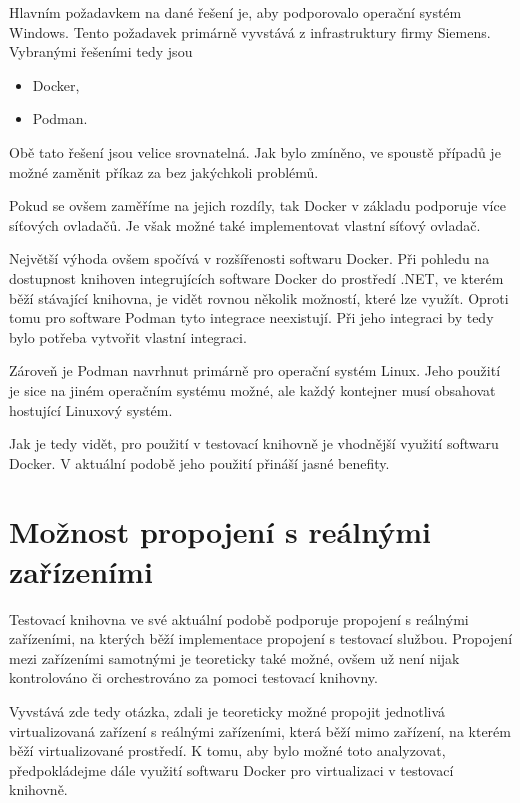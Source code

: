 Hlavním požadavkem na dané řešení je, aby podporovalo operační systém Windows. Tento požadavek primárně vyvstává z infrastruktury firmy Siemens. Vybranými řešeními tedy jsou

\begin{itemize}
    \item Docker,
    \item Podman.
\end{itemize}

Obě tato řešení jsou velice srovnatelná. Jak bylo zmíněno, ve spoustě případů je možné zaměnit příkaz  za  bez jakýchkoli problémů. 

Pokud se ovšem zaměříme na jejich rozdíly, tak Docker v základu podporuje více síťových ovladačů. Je však možné také implementovat vlastní síťový ovladač. \cite{docker_networking_overview}

Největší výhoda ovšem spočívá v rozšířenosti softwaru Docker. Při pohledu na dostupnost knihoven integrujících software Docker do prostředí .NET, ve kterém běží stávající knihovna, je vidět rovnou několik možností, které lze využít. Oproti tomu pro software Podman tyto integrace neexistují. Při jeho integraci by tedy bylo potřeba vytvořit vlastní integraci. 

Zároveň je Podman navrhnut primárně pro operační systém Linux. Jeho použití je sice na jiném operačním systému možné, ale každý kontejner musí obsahovat hostující Linuxový systém. 

Jak je tedy vidět, pro použití v testovací knihovně je vhodnější využití softwaru Docker. V aktuální podobě jeho použití přináší jasné benefity. 


\section{Možnost propojení s reálnými zařízeními}

Testovací knihovna ve své aktuální podobě podporuje propojení s reálnými zařízeními, na kterých běží implementace propojení s testovací službou. Propojení mezi zařízeními samotnými je teoreticky také možné, ovšem už není nijak kontrolováno či orchestrováno za pomoci testovací knihovny. 

Vyvstává zde tedy otázka, zdali je teoreticky možné propojit jednotlivá virtualizovaná zařízení s reálnými zařízeními, která běží mimo zařízení, na kterém běží virtualizované prostředí. K tomu, aby bylo možné toto analyzovat, předpokládejme dále využití softwaru Docker pro virtualizaci v testovací knihovně.

